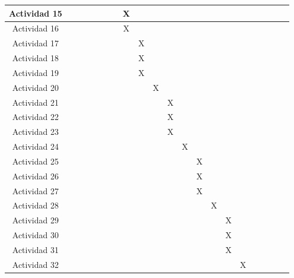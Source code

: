 \begin{center}
\begin{longtable}[c]{|c|c|c|c|c|c|c|c|c|c|c|c|c|c|c|c|c|}
    Actividad 15            & ~ & ~ & ~ & ~ & X & ~ & ~ & ~ & ~ & ~ & ~  & ~  & ~  & ~  & ~  & ~  \\ \hline
    Actividad 16            & ~ & ~ & ~ & ~ & X & ~ & ~ & ~ & ~ & ~  & ~  & ~  & ~  & ~  & ~  & ~  \\ \hline
    Actividad 17            & ~ & ~ & ~ & ~ & ~ & X & ~ & ~ & ~ & ~  & ~  & ~  & ~  & ~  & ~  & ~  \\ \hline
    Actividad 18            & ~ & ~ & ~ & ~ & ~ & X & ~ & ~ & ~ & ~  & ~ & ~  & ~  & ~  & ~  & ~  \\ \hline
    Actividad 19            & ~ & ~ & ~ & ~ & ~ & X & ~ & ~ & ~ & ~  & ~  & ~  & ~  & ~  & ~  & ~  \\ \hline
    Actividad 20            & ~ & ~ & ~ & ~ & ~ & ~ & X & ~ & ~ & ~  & ~  & ~  & ~  & ~  & ~  & ~  \\ \hline
    Actividad 21            & ~ & ~ & ~ & ~ & ~ & ~ & ~ & X & ~ & ~  & ~  & ~  & ~  & ~  & ~  & ~  \\ \hline
    Actividad 22            & ~ & ~ & ~ & ~ & ~ & ~ & ~ & X & ~ & ~  & ~  & ~  & ~  & ~  & ~  & ~  \\ \hline
    Actividad 23            & ~ & ~ & ~ & ~ & ~ & ~ & ~ & X & ~ & ~  & ~  & ~  & ~  & ~  & ~  & ~  \\ \hline
    Actividad 24            & ~ & ~ & ~ & ~ & ~ & ~ & ~ & ~ & X & ~  & ~  & ~  & ~  & ~  & ~  & ~  \\ \hline
    Actividad 25            & ~ & ~ & ~ & ~ & ~ & ~ & ~ & ~ & ~ & X  & ~  & ~  & ~  & ~  & ~  & ~  \\ \hline
    Actividad 26            & ~ & ~ & ~ & ~ & ~ & ~ & ~ & ~ & ~ & X  & ~  & ~  & ~  & ~  & ~  & ~  \\ \hline
    Actividad 27            & ~ & ~ & ~ & ~ & ~ & ~ & ~ & ~ & ~ & X  & ~  & ~  & ~  & ~  & ~  & ~  \\ \hline
    Actividad 28            & ~ & ~ & ~ & ~ & ~ & ~ & ~ & ~ & ~ & ~  & X  & ~  & ~  & ~  & ~  & ~  \\ \hline
    Actividad 29            & ~ & ~ & ~ & ~ & ~ & ~ & ~ & ~ & ~ & ~  & ~  & X  & ~  & ~  & ~  & ~  \\ \hline
    Actividad 30            & ~ & ~ & ~ & ~ & ~ & ~ & ~ & ~ & ~ & ~  & ~  & X  & ~  & ~  & ~  & ~  \\ \hline
    Actividad 31            & ~ & ~ & ~ & ~ & ~ & ~ & ~ & ~ & ~ & ~  & ~  & X  & ~  & ~  & ~  & ~  \\ \hline
    Actividad 32            & ~ & ~ & ~ & ~ & ~ & ~ & ~ & ~ & ~ & ~  & ~  & ~  & X  & ~  & ~  & ~  \\ \hline

\end{longtable}
\end{center}
